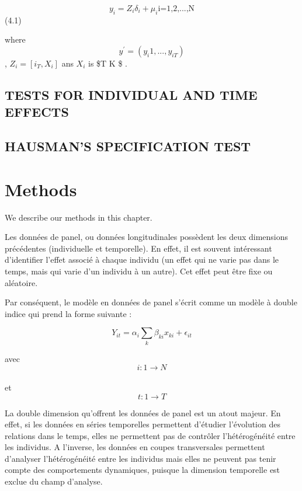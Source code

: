 \documentclass[
]{book}
\begin{document}
\begin{equation}
  y_i=Z_i \delta _i + \mu_i \text{i=1,2,...,N}
\end{equation} (4.1)

where \[ y^{\prime}=(y_i1,...,y_{iT}) \], \(Z_i=[i_T,X_i]\) ans \(X_i\) is \$T \times K \$ .

\hypertarget{tests-for-individual-and-time-effects}{%
\section{TESTS FOR INDIVIDUAL AND TIME EFFECTS}\label{tests-for-individual-and-time-effects}}

\hypertarget{hausmans-specification-test}{%
\section{HAUSMAN'S SPECIFICATION TEST}\label{hausmans-specification-test}}

\hypertarget{methods}{%
\chapter{Methods}\label{methods}}

We describe our methods in this chapter.

Les données de panel, ou données longitudinales possèdent les deux dimensions précédentes (individuelle et temporelle). En effet, il est souvent intéressant d'identifier l'effet associé à chaque individu (un effet qui ne varie pas dans le temps, mais qui varie d'un individu à un autre). Cet effet peut être fixe ou aléatoire.

Par conséquent, le modèle en données de panel s'écrit comme un modèle à double indice qui prend la forme suivante :

\[ Y_{it}= \alpha_i\sum_{k}\beta_{ki}x_{ki}+ \epsilon_{it} \]

avec
\[ i:1 \rightarrow N \]\\
et
\[ t:1 \rightarrow T \]

La double dimension qu'offrent les données de panel est un atout majeur. En effet, si les données en séries temporelles permettent d'étudier l'évolution des relations dans le temps, elles ne permettent pas de contrôler l'hétérogénéité entre les individus. A l'inverse, les données en coupes transversales permettent d'analyser l'hétérogénéité entre les individus mais elles ne peuvent pas tenir compte des comportements dynamiques, puisque la dimension temporelle est exclue du champ d'analyse.
\end{document}
